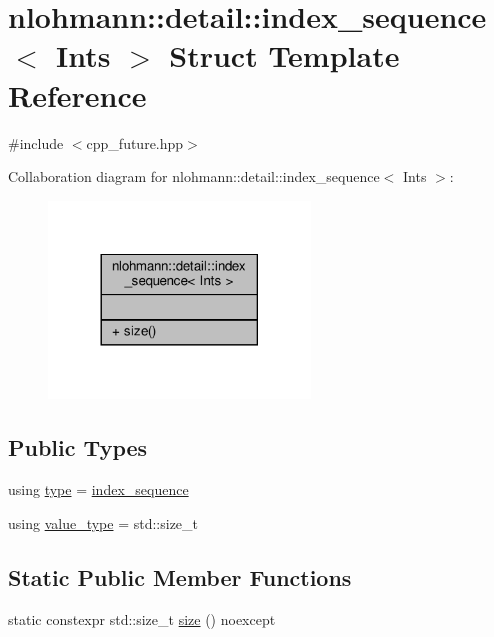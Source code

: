 \hypertarget{structnlohmann_1_1detail_1_1index__sequence}{}\section{nlohmann\+:\+:detail\+:\+:index\+\_\+sequence$<$ Ints $>$ Struct Template Reference}
\label{structnlohmann_1_1detail_1_1index__sequence}


{\ttfamily \#include $<$cpp\+\_\+future.\+hpp$>$}



Collaboration diagram for nlohmann\+:\+:detail\+:\+:index\+\_\+sequence$<$ Ints $>$\+:
\nopagebreak
\begin{figure}[H]
\begin{center}
\leavevmode
\includegraphics[width=197pt]{structnlohmann_1_1detail_1_1index__sequence__coll__graph}
\end{center}
\end{figure}
\subsection*{Public Types}
\begin{DoxyCompactItemize}
\item 
using \hyperlink{structnlohmann_1_1detail_1_1index__sequence_a3c14c4ab277de72b166806193ff4fa10}{type} = \hyperlink{structnlohmann_1_1detail_1_1index__sequence}{index\+\_\+sequence}
\item 
using \hyperlink{structnlohmann_1_1detail_1_1index__sequence_a2eca43d08fc1eb68bd5fa75b6714d21d}{value\+\_\+type} = std\+::size\+\_\+t
\end{DoxyCompactItemize}
\subsection*{Static Public Member Functions}
\begin{DoxyCompactItemize}
\item 
static constexpr std\+::size\+\_\+t \hyperlink{structnlohmann_1_1detail_1_1index__sequence_a7ac529419787d775f52408135304b337}{size} () noexcept
\end{DoxyCompactItemize}


